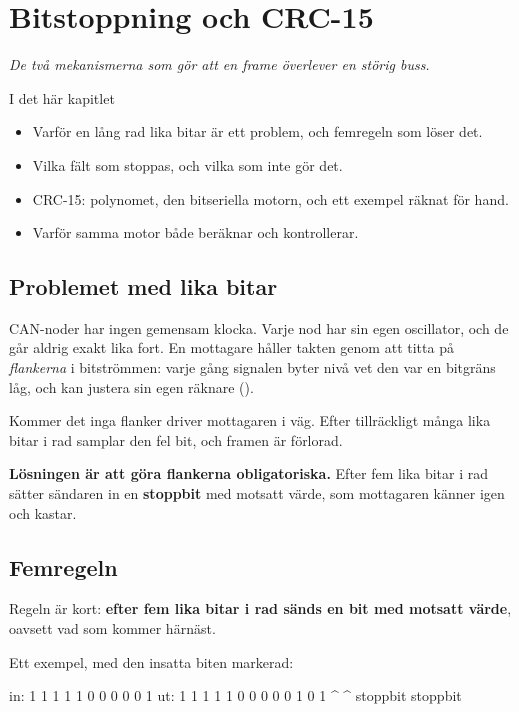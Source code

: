 \chapter{Bitstoppning och CRC-15}
\label{ch:stuffing}

{\large\itshape De två mekanismerna som gör att en frame överlever en störig buss.\par}

\begin{chapterbox}{I det här kapitlet}
\begin{itemize}
  \item Varför en lång rad lika bitar är ett problem, och femregeln som löser det.
  \item Vilka fält som stoppas, och vilka som inte gör det.
  \item CRC-15: polynomet, den bitseriella motorn, och ett exempel räknat för hand.
  \item Varför samma motor både beräknar och kontrollerar.
\end{itemize}
\end{chapterbox}

\section{Problemet med lika bitar}

CAN-noder har ingen gemensam klocka. Varje nod har sin egen oscillator, och de går aldrig exakt
lika fort. En mottagare håller takten genom att titta på \emph{flankerna} i bitströmmen: varje
gång signalen byter nivå vet den var en bitgräns låg, och kan justera sin egen räknare
().

Kommer det inga flanker driver mottagaren i väg. Efter tillräckligt många lika bitar i rad
samplar den fel bit, och framen är förlorad.

\textbf{Lösningen är att göra flankerna obligatoriska.} Efter fem lika bitar i rad sätter
sändaren in en \textbf{stoppbit} med motsatt värde, som mottagaren känner igen och kastar.

\section{Femregeln}

Regeln är kort: \textbf{efter fem lika bitar i rad sänds en bit med motsatt värde}, oavsett vad
som kommer härnäst.

Ett exempel, med den insatta biten markerad:

\begin{console}
in:  1 1 1 1 1 0 0 0 0 0 1
ut:  1 1 1 1 1 0 0 0 0 0 1 0 1
               ^         ^
           stoppbit  stoppbit
\end{console}

